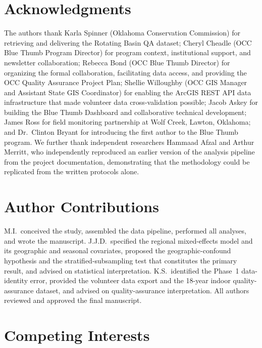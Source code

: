 \documentclass[lineno]{wlpeerj}
\begin{document}
\section{Acknowledgments}

The authors thank Karla Spinner (Oklahoma Conservation Commission) for retrieving and delivering the Rotating Basin QA dataset; Cheryl Cheadle (OCC Blue Thumb Program Director) for program context, institutional support, and newsletter collaboration; Rebecca Bond (OCC Blue Thumb Director) for organizing the formal collaboration, facilitating data access, and providing the OCC Quality Assurance Project Plan; Shellie Willoughby (OCC GIS Manager and Assistant State GIS Coordinator) for enabling the ArcGIS REST API data infrastructure that made volunteer data cross-validation possible; Jacob Askey for building the Blue Thumb Dashboard and collaborative technical development; James Ross for field monitoring partnership at Wolf Creek, Lawton, Oklahoma; and Dr.\ Clinton Bryant for introducing the first author to the Blue Thumb program. We further thank independent researchers Hammaad Afzal and Arthur Merritt, who independently reproduced an earlier version of the analysis pipeline from the project documentation, demonstrating that the methodology could be replicated from the written protocols alone.

\section*{Author Contributions}

M.I.\ conceived the study, assembled the data pipeline, performed all analyses, and wrote the manuscript. J.J.D.\ specified the regional mixed-effects model and its geographic and seasonal covariates, proposed the geographic-confound hypothesis and the stratified-subsampling test that constitutes the primary result, and advised on statistical interpretation. K.S.\ identified the Phase~1 data-identity error, provided the volunteer data export and the 18-year indoor quality-assurance dataset, and advised on quality-assurance interpretation. All authors reviewed and approved the final manuscript.

\section*{Competing Interests}
\end{document}
